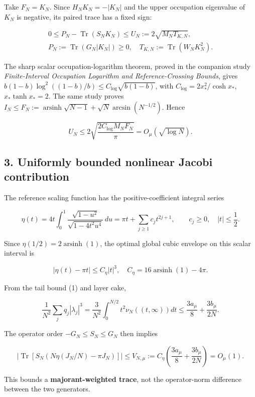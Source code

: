 \documentclass[
  10pt,
  a4paper,
]{article}
\begin{document}
Take \(F_N=K_N\). Since \(H_NK_N=-|K_N|\) and the upper occupation eigenvalue of \(K_N\) is negative, its paired trace has a fixed sign:

\[
\boxed{\begin{gathered}0\le P_N-\operatorname{Tr}(S_NK_N)
\le U_N:=2\sqrt{M_NT_{K,N}},\\
P_N:=\operatorname{Tr}(G_N|K_N|)\ge0,\quad T_{K,N}:=\operatorname{Tr}(W_NK_N^2).
\end{gathered}}
\tag{5}
\]

The sharp scalar occupation-logarithm theorem, proved in the companion study \emph{Finite-Interval Occupation Logarithm and Reference-Crossing Bounds}, gives \(b(1-b)\log^2((1-b)/b)\le C_{\log}\sqrt{b(1-b)}\), with \(C_{\log}=2x_*^2/\cosh x_*\), \(x_*\tanh x_*=2\). The same study proves \(I_N\le F_N:=\operatorname{arsinh}\sqrt{N-1}+\sqrt N\arcsin(N^{-1/2})\). Hence

\[
\boxed{U_N\le2\sqrt{\frac{2C_{\log}M_NF_N}{\pi}}=O_\mu(\sqrt{\log N}).}
\tag{6}
\]

\subsection{3. Uniformly bounded nonlinear Jacobi contribution}\label{uniformly-bounded-nonlinear-jacobi-contribution}

The reference scaling function has the positive-coefficient integral series

\[
\eta(t)=4t\int_0^1\frac{\sqrt{1-u^2}}{\sqrt{1-4t^2u^4}}\,du
=\pi t+\sum_{j\ge1}c_jt^{2j+1},\qquad c_j\ge0,
\quad |t|\le\frac12.
\]

Since \(\eta(1/2)=2\operatorname{arsinh}(1)\), the optimal global cubic envelope on this scalar interval is

\[
\boxed{|\eta(t)-\pi t|\le C_\eta|t|^3,\quad
C_\eta=16\operatorname{arsinh}(1)-4\pi.}
\tag{7}
\]

From the tail bound (1) and layer cake,

\[
\frac1{N^2}\sum_jq_j|\lambda_j|^3
=\frac3{N^2}\int_0^{N/2}t^2\nu_N((t,\infty))dt
\le\frac{3a_\mu}{8}+\frac{3b_\mu}{2N}.
\]

The operator order \(-G_N\le S_N\le G_N\) then implies

\[
\boxed{
\left|\operatorname{Tr}\left[S_N(N\eta(J_N/N)-\pi J_N)\right]\right|
\le V_{N,\mu}:=C_\eta\left(\frac{3a_\mu}{8}+\frac{3b_\mu}{2N}\right)=O_\mu(1).}
\tag{8}
\]

This bounds a \textbf{majorant-weighted trace}, not the operator-norm difference between the two generators.
\end{document}
